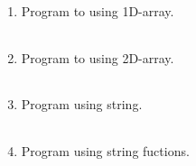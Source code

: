 \documentclass{exam}
\begin{document}
\begin{enumerate}
   \item  Program  to using 1D-array.

   \begin{myTableStyle}
   \begin{center} \begin{tabular}{ |m{14cm}| } \hline
              \\ \hline
    \end{tabular} \end{center}
\end{myTableStyle}
  \pagebreak\pagebreak

   \item  Program  to using  2D-array.

   \begin{myTableStyle}
   \begin{center} \begin{tabular}{ |m{14cm}| } \hline
              \\ \hline
    \end{tabular} \end{center}
\end{myTableStyle}
  \pagebreak

   \item  Program  using string.

   \begin{myTableStyle}
   \begin{center} \begin{tabular}{ |m{14cm}| } \hline
              \\ \hline
    \end{tabular} \end{center}
\end{myTableStyle}
  \pagebreak

   \item  Program  using string fuctions.

   \begin{myTableStyle}
   \begin{center} \begin{tabular}{ |m{14cm}| } \hline
              \\ \hline
    \end{tabular} \end{center}
\end{myTableStyle}
  \pagebreak\pagebreak


\end{enumerate}
\end{document}

